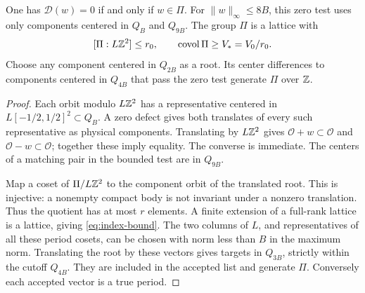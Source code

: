 \begin{lemma}\label{lem:recognition}
One has $\mathcal D(w)=0$ if and only if $w\in\Pi$. For
$\|w\|_\infty\le8B$, this zero test uses only components centered in
$Q_B$ and $Q_{9B}$. The group $\Pi$ is a lattice with
\begin{equation}\label{eq:index-bound}
 [\Pi:L\mathbb Z^2]\le r_0,\qquad\operatorname{covol}\Pi\ge V_*=V_0/r_0.
\end{equation}
Choose any component centered in $Q_{2B}$ as a root. Its center
differences to components centered in $Q_{4B}$ that pass the zero
test generate $\Pi$ over $\mathbb Z$.
\end{lemma}
\begin{proof}
Each orbit modulo $L\mathbb Z^2$ has a representative centered in
$L[-1/2,1/2]^2\subset Q_B$. A zero defect gives both translates of
every such representative as physical components. Translating by
$L\mathbb Z^2$ gives $\mathcal O+w\subset\mathcal O$ and
$\mathcal O-w\subset\mathcal O$; together these imply equality.
The converse is immediate. The centers of a matching pair in the
bounded test are in $Q_{9B}$.

Map a coset of $\Pi/L\mathbb Z^2$ to the component orbit of the translated
root. This is injective: a nonempty compact body is not invariant
under a nonzero translation. Thus the quotient has at most $r$ elements.
A finite extension of a full-rank lattice is a lattice, giving
\eqref{eq:index-bound}. The two columns of $L$, and representatives
of all these period cosets, can be chosen with norm less than $B$
in the maximum norm. Translating the root by these vectors gives
targets in $Q_{3B}$, strictly within the cutoff $Q_{4B}$. They are
included in the accepted list and generate $\Pi$. Conversely each
accepted vector is a true period.
\end{proof}

